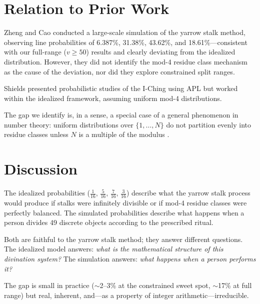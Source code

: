 \documentclass{article}
\begin{document}
\section{Relation to Prior Work}\label{sec:prior}

Zheng and Cao \cite{zheng2023bigdata} conducted a large-scale simulation of the yarrow stalk method, observing line probabilities of 6.387\%, 31.38\%, 43.62\%, and 18.61\%---consistent with our full-range ($v \geq 50$) results and clearly deviating from the idealized distribution. However, they did not identify the mod-4 residue class mechanism as the cause of the deviation, nor did they explore constrained split ranges.

Shields \cite{shields1999yarrow} presented probabilistic studies of the I-Ching using APL but worked within the idealized framework, assuming uniform mod-4 distributions.

The gap we identify is, in a sense, a special case of a general phenomenon in number theory: uniform distributions over $\{1, \ldots, N\}$ do not partition evenly into residue classes unless $N$ is a multiple of the modulus \cite{hardy1979introduction}.

\section{Discussion}\label{sec:discussion}

The idealized probabilities ($\frac{1}{16}$, $\frac{5}{16}$, $\frac{7}{16}$, $\frac{3}{16}$) describe what the yarrow stalk process would produce if stalks were infinitely divisible or if mod-4 residue classes were perfectly balanced. The simulated probabilities describe what happens when a person divides 49 discrete objects according to the prescribed ritual.

Both are faithful to the yarrow stalk method; they answer different questions. The idealized model answers: \textit{what is the mathematical structure of this divination system?} The simulation answers: \textit{what happens when a person performs it?}

The gap is small in practice ($\sim$2--3\% at the constrained sweet spot, $\sim$17\% at full range) but real, inherent, and---as a property of integer arithmetic---irreducible.
\end{document}
